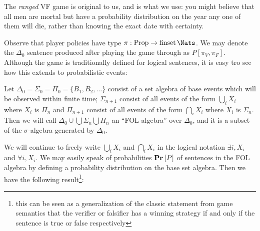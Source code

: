 The \emph{ranged} VF game is original to us, and is what we use: you might believe that all men are mortal but have a probability distribution on the year any one of them will die, rather than knowing the exact date with certainty.

Observe that player policies have type $\pi:\Props\to\finset\Nats$. We may denote the $\Delta_0$ sentence produced after playing the game through as $P[\pi_V,\pi_F]$. Although the game is traditionally defined for logical sentences, it is easy tro see how this extends to probabilistic events:

\begin{definition}
  Let $\Delta_0=\Sigma_0=\Pi_0=\{B_1,B_2,\dots\}$ consist of a set algebra of base events which will be observed within finite time; $\Sigma_{n+1}$ consist of all events of the form $\bigcup_{i}X_i$ where $X_i$ is $\Pi_n$ and $\Pi_{n+1}$ consist of all events of the form $\bigcap_{i}X_i$ where $X_i$ is $\Sigma_n$. Then we will call $\Delta_0\cup\bigcup\Sigma_n\bigcup\Pi_n$ an ``FOL algebra'' over $\Delta_0$, and it is a subset of the $\sigma$-algebra generated by $\Delta_0$.
  \label{def:probfol}
\end{definition}

We will continue to freely write $\bigcup_{i}X_i$ and $\bigcap_{i}X_i$ in the logical notation $\exists i,X_i$ and $\forall i,X_i$. We may easily speak of probabilities $\VFPAPERProb{P}$ of sentences in the FOL algebra by defining a probability distribution on the base set algebra. Then we have the following result\footnote{this can be seen as a generalization of the classic statement from game semantics that the verifier or falsifier has a winning strategy if and only if the sentence is true or false respectively}:

